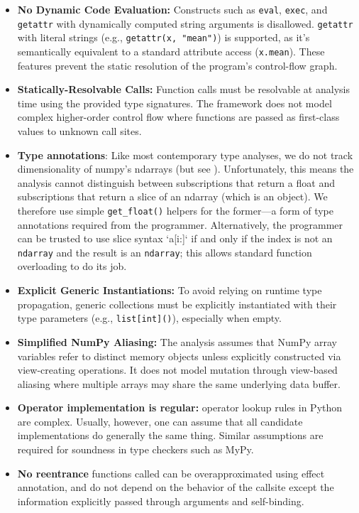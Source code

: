 \begin{itemize}
    \item \textbf{No Dynamic Code Evaluation:} Constructs such as \texttt{eval}, \texttt{exec}, and \texttt{getattr} with dynamically computed string arguments is disallowed. \texttt{getattr} with literal strings (e.g., \texttt{getattr(x, "mean")}) is supported, as it's semantically equivalent to a standard attribute access (\texttt{x.mean}). These features prevent the static resolution of the program's control-flow graph.
    \item \textbf{Statically-Resolvable Calls:} Function calls must be resolvable at analysis time using the provided type signatures. The framework does not model complex higher-order control flow where functions are passed as first-class values to unknown call sites.
    \item \textbf{Type annotations}: Like most contemporary type analyses, we do not track dimensionality of numpy's \textsf{ndarrays} (but see \cite{liu2020type}). Unfortunately, this means the analysis cannot distinguish between subscriptions that return a \textsf{float} and subscriptions that return a slice of an \textsf{ndarray} (which is an object). We therefore use simple \texttt{get\_float()} helpers for the former---a form of type annotations required from the programmer. Alternatively, the programmer can be trusted to use slice syntax `a[i:]` if and only if the index is not an \texttt{ndarray} and the result is an \texttt{ndarray}; this allows standard function overloading to do its job. 
    \item \textbf{Explicit Generic Instantiations:} To avoid relying on runtime type propagation, generic collections must be explicitly instantiated with their type parameters (e.g., \texttt{list[int]()}), especially when empty.
    \item \textbf{Simplified NumPy Aliasing:} The analysis assumes that NumPy array variables refer to distinct memory objects unless explicitly constructed via view-creating operations. It does not model mutation through view-based aliasing where multiple arrays may share the same underlying data buffer.
    \item \textbf{Operator implementation is regular:} operator lookup rules in Python are complex. Usually, however, one can assume that all candidate implementations do generally the same thing. Similar assumptions are required for soundness in type checkers such as MyPy.
    \item \textbf{No reentrance} functions called can be overapproximated using effect annotation, and do not depend on the behavior of the callsite except the information explicitly passed through arguments and self-binding.
\end{itemize}


